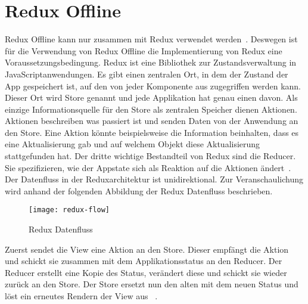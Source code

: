 \section{\label{sub:reduxoffline}Redux Offline}
Redux Offline kann nur zusammen mit Redux verwendet werden~\cite{redux-req}. Deswegen ist für die Verwendung von Redux Offline die Implementierung von Redux eine Voraussetzungsbedingung.
%
%
Redux ist eine Bibliothek zur Zustandsverwaltung in JavaScriptanwendungen.
Es gibt einen zentralen Ort, in dem der Zustand der App gespeichert ist, auf den von jeder Komponente aus zugegriffen werden kann.
Dieser Ort wird Store genannt und jede Applikation hat genau einen davon. 
Als einzige Informationsquelle für den Store als zentralen Speicher dienen Aktionen. 
Aktionen beschreiben was passiert ist und senden Daten von der Anwendung an den Store.
Eine Aktion könnte beispielsweise die Information beinhalten, dass es eine Aktualisierung gab und auf welchem Objekt diese Aktualisierung stattgefunden hat.
Der dritte wichtige Bestandteil von Redux sind die Reducer. Sie spezifizieren, wie der \gls{App}state sich als Reaktion auf die Aktionen ändert~\cite{redux}.\\
Der Datenfluss in der Reduxarchitektur ist unidirektional. Zur Veranschaulichung wird anhand der folgenden Abbildung der Redux Datenfluss beschrieben.
%
\begin{figure}[H]
  \centering
  \texttt{[image: redux-flow]}
  \grayRule
  \caption{Redux Datenfluss}
  \label{fig:rdx-dataflow}
\end{figure}
% 
Zuerst sendet die View eine Aktion an den Store. Dieser empfängt die Aktion und schickt sie zusammen mit dem Applikationsstatus an den Reducer.
Der Reducer erstellt eine Kopie des Status, verändert diese und schickt sie wieder zurück an den Store.
Der Store ersetzt nun den alten mit dem neuen Status und löst ein erneutes Rendern der View aus ~\cite{reduxflow}.
